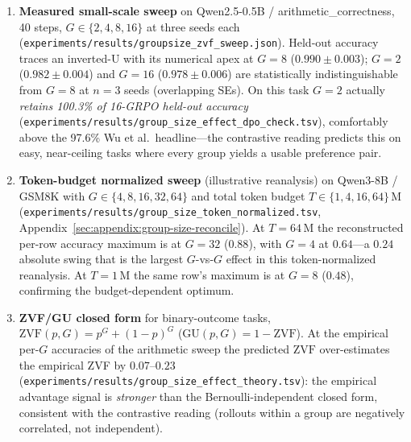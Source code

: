 \begin{enumerate}
  \item \textbf{Measured small-scale sweep} on Qwen2.5-0.5B /
        arithmetic\_correctness, 40 steps, $G \in \{2, 4, 8, 16\}$ at
        three seeds each
        (\texttt{experiments/results/groupsize\_zvf\_sweep.json}).
        Held-out accuracy traces an inverted-U with its numerical apex
        at $G{=}8$ ($0.990{\pm}0.003$); $G{=}2$ ($0.982{\pm}0.004$) and
        $G{=}16$ ($0.978{\pm}0.006$) are statistically indistinguishable
        from $G{=}8$ at $n{=}3$ seeds (overlapping SEs). On this task
        $G{=}2$ actually \emph{retains 100.3\% of 16-GRPO held-out accuracy}
        (\texttt{experiments/results/group\_size\_effect\_dpo\_check.tsv}),
        comfortably above the 97.6\% Wu et al.\ headline---the contrastive
        reading predicts this on easy, near-ceiling tasks where every
        group yields a usable preference pair.
  \item \textbf{Token-budget normalized sweep} (illustrative reanalysis)
        on Qwen3-8B / GSM8K with $G \in \{4, 8, 16, 32, 64\}$ and total
        token budget $T \in \{1, 4, 16, 64\}\,$M
        (\texttt{experiments/results/group\_size\_token\_normalized.tsv},
        Appendix~\ref{sec:appendix:group-size-reconcile}). At
        $T{=}64\,$M the reconstructed per-row accuracy maximum is at $G{=}32$
        ($0.88$), with $G{=}4$ at $0.64$---a $0.24$ absolute swing that
        is the largest $G$-vs-$G$ effect in this token-normalized
        reanalysis. At $T{=}1\,$M the same row's maximum is at $G{=}8$
        ($0.48$), confirming the budget-dependent optimum.
  \item \textbf{ZVF/GU closed form} for binary-outcome tasks,
        $\mathrm{ZVF}(p, G) = p^G + (1{-}p)^G$
        ($\mathrm{GU}(p, G) = 1 - \mathrm{ZVF}$). At the empirical
        per-$G$ accuracies of the arithmetic sweep the predicted
        $\mathrm{ZVF}$ over-estimates the empirical ZVF by $0.07$--$0.23$
        (\texttt{experiments/results/group\_size\_effect\_theory.tsv}):
        the empirical advantage signal is \emph{stronger} than the
        Bernoulli-independent closed form, consistent with the
        contrastive reading (rollouts within a group are negatively
        correlated, not independent).
\end{enumerate}

